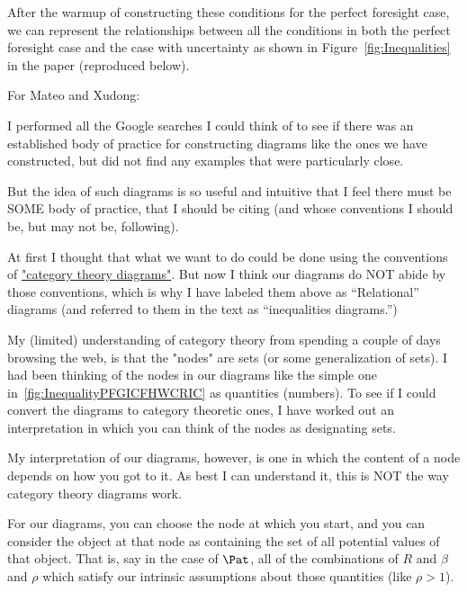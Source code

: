 \documentclass[\econtexRoot/BufferStockTheory]{subfiles}
\begin{document}
After the warmup of constructing these conditions for the perfect foresight case, we can represent the relationships between all the conditions in both the perfect foresight case and the case with uncertainty as shown in Figure~\ref{fig:Inequalities} in the paper (reproduced below).

\renewcommand{\figName}{Inequalities} %
\renewcommand{\figFile}{\figName} %
\hypertarget{\figFile}{}
\hypertarget{\figName}{}

\begin{Private}
  \pagebreak


  For Mateo and Xudong:
  
  I performed all the Google searches I could think of to see if there was an established body of practice for constructing diagrams like the ones we have constructed, but did not find any examples that were particularly close.  

  But the idea of such diagrams is so useful and intuitive that I feel there must be SOME body of practice, that I should be citing (and whose conventions I should be, but may not be, following).

  At first I thought that what we want to do could be done using the conventions of \href{https://mathematica.stackexchange.com/questions/8654/creating-diagrams-for-category-theory}{"category theory diagrams"}. But now I think our diagrams do NOT abide by those conventions, which is why I have labeled them above as ``Relational'' diagrams (and referred to them in the text as ``inequalities diagrams.'')

  My (limited) understanding of category theory from spending a couple of days browsing the web, is that the "nodes" are sets (or some generalization of sets). I had been thinking of the nodes in our diagrams like the simple one in~\ref{fig:InequalityPFGICFHWCRIC} as quantities (numbers).  To see if I could convert the diagrams to category theoretic ones, I have worked out an interpretation in which you can think of the nodes as designating sets.

  My interpretation of our diagrams, however, is one in which the content of a node depends on how you got to it. As best I can understand it, this is NOT the way category theory diagrams work.

  For our diagrams, you can choose the node at which you start, and you can consider the object at that node as containing the set of all potential values of that object. That is, say in the case of $\Pat$, all of the combinations of ${R}$ and ${\beta}$ and ${\rho}$ which satisfy our intrinsic assumptions about those quantities (like ${\rho} > 1$).


\end{Private}
\end{document}

